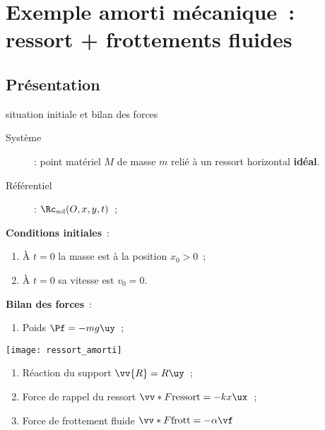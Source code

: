 \documentclass[../main/main.tex]{subfiles}
\begin{document}
\vspace{-15pt}
\section{Exemple amorti mécanique~: ressort + frottements fluides}

\subsection{Présentation}
\begin{defi}[label=def:ressortamorti, sidebyside, righthand ratio=.5]{situation
    initiale et bilan des forces}
    \begin{description}
        \item[Système] : point matériel $M$ de masse $m$ relié à un ressort
            horizontal \textbf{idéal}.
        \item[Référentiel] : $\Rc_{\rm sol} (O,x,y,t)$~;
    \end{description}

    \bigbreak

    \textbf{Conditions initiales}~:
    \begin{enumerate}[leftmargin=20pt]
        \item À $t=0$ la masse est à la position $x_0 > 0$~;
        \item À $t=0$ sa vitesse est $v_0 = 0$.
    \end{enumerate}

    \textbf{Bilan des forces}~:
    \begin{enumerate}
        \item Poids $\Pf = -mg\uy$~;
    \end{enumerate}

    \tcblower
    \begin{center}
        \texttt{[image: ressort\_amorti]}
    \end{center}

    \begin{enumerate}[start=2]
        \item Réaction du support $\vv{R} = R\uy$~;
        \item Force de rappel du ressort $\vv*{F}{\rm ressort} = -kx\ux$~;
        \item Force de frottement fluide $\vv*{F}{\rm frott} = -\alpha\vf$
    \end{enumerate}

\end{defi}
\end{document}
